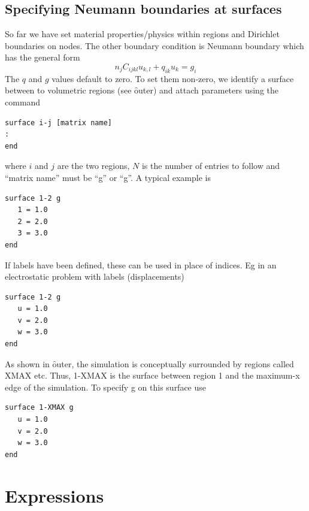 \documentclass[a4paper,twoside,11pt]{book}
\begin{document}
\subsection{Specifying Neumann boundaries at surfaces}
\label{neumanspec}

So far we have set material properties/physics within
regions and Dirichlet boundaries on nodes. The other boundary
condition is Neumann boundary which has the general form
\begin{equation}
  n_jC_{ijkl}u_{k,l}+q_{ik}u_k=g_i
\end{equation}
The $q$ and $g$ values default to zero. To set them non-zero, we
identify a surface between to volumetric regions (see \f{outer}) and attach
parameters using the command
\begin{verbatim}
surface i-j [matrix name]
:
end
\end{verbatim}
where $i$ and $j$ are the two regions, $N$ is the number of entries to
follow and ``matrix name'' must be ``g'' or ``g''. A typical example is
\begin{verbatim}
surface 1-2 g
   1 = 1.0
   2 = 2.0
   3 = 3.0
end
\end{verbatim}
If labels have been defined, these can be used in place of indices. Eg in an
electrostatic problem with labels (displacements) 
\begin{verbatim}
surface 1-2 g
   u = 1.0
   v = 2.0
   w = 3.0
end
\end{verbatim}
As shown in \f{outer}, the simulation is conceptually surrounded by
regions called XMAX etc. Thus, 1-XMAX is the surface between region 1
and the maximum-x edge of the simulation. To specify g on this surface use
\begin{verbatim}
surface 1-XMAX g
   u = 1.0
   v = 2.0
   w = 3.0
end
\end{verbatim}

\section{Expressions}
\label{expressions}
\end{document}
